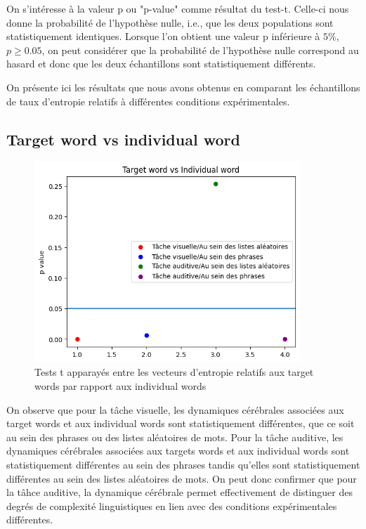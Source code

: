 On s'intéresse à la valeur p ou "p-value" comme résultat du test-t. Celle-ci nous donne la probabilité de l'hypothèse nulle, i.e., que les deux populations sont statistiquement identiques. Lorsque l'on obtient une valeur p inférieure à $5\%$, $p\geq 0.05$, on peut considérer que la probabilité de l'hypothèse nulle correspond au hasard et donc que les deux échantillons sont statistiquement différents.

On présente ici les résultats que nous avons obtenus en comparant les échantillons de taux d'entropie relatifs à différentes conditions expérimentales.

\subsection{Target word vs individual word}

\begin{figure}[!ht]
    \centering
    \includegraphics[width=10cm]{Targetword_vs_Individualword.png}
    \caption{Tests t apparayés entre les vecteurs d'entropie relatifs aux target words par rapport aux individual words}
    \label{fig6.1}
\end{figure}

On observe que pour la tâche visuelle, les dynamiques cérébrales associées aux target words et aux individual words sont statistiquement différentes, que ce soit au sein des phrases ou des listes aléatoires de mots. Pour la tâche auditive, les dynamiques cérébrales associées aux targets words et aux individual words sont statistiquement différentes au sein des phrases tandis qu'elles sont statistiquement différentes au sein des listes aléatoires de mots. On peut donc confirmer que pour la tâhce auditive, la dynamique cérébrale permet effectivement de distinguer des degrés de complexité linguistiques en lien avec des conditions expérimentales différentes.

